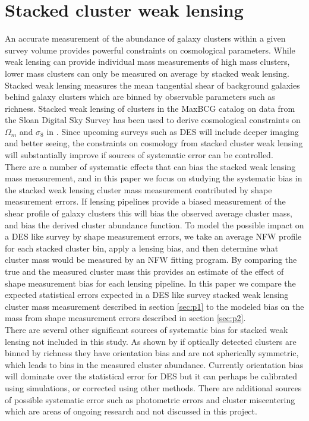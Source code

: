 \documentclass[useAMS,usenatbib]{mn2e}
\begin{document}
\section{Stacked cluster weak lensing}
An accurate measurement of the abundance of galaxy clusters within a
given survey volume provides powerful constraints on cosmological
parameters.  While weak lensing can provide individual mass
measurements of high mass clusters, lower mass clusters can only be
measured on average by stacked weak lensing. Stacked weak lensing
measures the mean tangential shear of  background galaxies behind
galaxy clusters which are binned by observable parameters such as
richness. Stacked weak lensing
of clusters in the MaxBCG catalog \citep{Koester, Eshel} on data from the 
Sloan Digital Sky Survey \citep{York} has been used to derive
cosmological constraints on $\Omega_m$ and $\sigma_8$ in
\citep{Ying, ERozo}. Since upcoming surveys such as DES  will include deeper
imaging and better seeing, the constraints on cosmology
from stacked cluster weak lensing will substantially improve if
sources of systematic error can be controlled. \\
\indent There are a number of systematic effects that can bias the
stacked weak lensing mass measurement, and in this paper we focus
on studying the systematic bias in the stacked weak lensing cluster
mass measurement contributed by shape measurement errors. If lensing
pipelines provide a biased measurement of the shear profile of galaxy
clusters this will bias the observed average cluster mass, and bias
the derived cluster abundance function. To model the possible
impact on a DES like survey by shape measurement errors, we take an
average NFW profile for each stacked cluster bin, apply a lensing
bias, and then determine what cluster mass would be measured by
an NFW fitting program. By comparing the true and the measured cluster
mass this provides an estimate of the effect of shape measurement bias
for each lensing pipeline. In this paper we compare the expected statistical errors
expected in a DES like survey stacked weak lensing cluster mass measurement
described in section \ref{sec:p1} to the modeled bias on the mass
from shape measurement errors described in section \ref{sec:p2}. \\
\indent There are several other significant sources of systematic bias for
stacked weak lensing not included in this study. As shown by
\citep{Joerg} if optically detected clusters are binned by richness
they have orientation bias and are not spherically symmetric, which
leads to bias in the measured cluster abundance. Currently
orientation bias will dominate over the statistical error for DES but
it can perhaps be calibrated using simulations, or corrected using
other methods. There are additional sources of possible systematic
error such as photometric errors and cluster miscentering which are 
areas of ongoing research and not discussed in this project.
\end{document}
